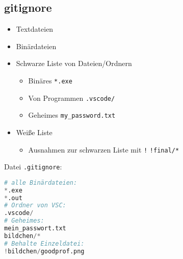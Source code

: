 \subsection{gitignore}
\begin{frame}
\begin{itemize}
\item<3-> Textdateien
\end{itemize}
\begin{itemize}
\item<5-> Binärdateien
\end{itemize}
\end{frame}

\begin{frame}
\begin{itemize}
\item<1-> Schwarze Liste von Dateien/Ordnern
\begin{itemize}
\item<2-> Binäres \hfill \lstinline`*.exe`
\item<3-> Von Programmen \hfill \lstinline`.vscode/`
\item<4-> Geheimes \hfill \lstinline`my_password.txt`
\end{itemize}
\item<5-> Weiße Liste
\begin{itemize}
\item<6-> Ausnahmen zur schwarzen Liste mit \lstinline`!` \hfill \lstinline`!final/*`
\end{itemize}
\end{itemize}
\end{frame}

\begin{frame}[fragile]
Datei \lstinline`.gitignore`:
\begin{lstlisting}[numbers=none, language=python]
# alle Binärdateien:
*.exe
*.out
# Ordner von VSC:
.vscode/
# Geheimes:
mein_passwort.txt
bildchen/*
# Behalte Einzeldatei:
!bildchen/goodprof.png
\end{lstlisting}
\end{frame}


